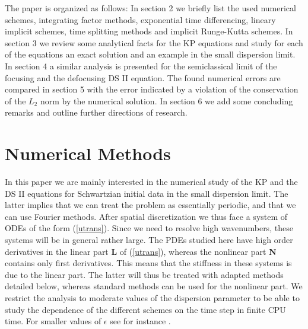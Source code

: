 \documentclass[final]{siamltex}
\begin{document}
The paper is organized as follows: In section 2 we briefly list the 
used numerical schemes, integrating factor methods, exponential time 
differencing, lineary implicit schemes, time splitting methods and 
implicit Runge-Kutta schemes. In 
section 3 we review some analytical facts for the KP equations and 
study  for each of the equations an exact solution and an example in the 
small  dispersion limit. In section 4 a similar 
analysis is presented for the semiclassical limit of the 
focusing and the defocusing DS II equation. The 
found numerical errors are compared in section 5 with the error 
indicated by a violation of the conservation of the $L_{2}$ norm by the numerical 
solution. In section 6 we add some concluding remarks 
and outline further directions of research. 
 
\section{Numerical Methods}
In this paper we are mainly interested in the numerical study of the KP and 
the DS II equations for Schwartzian initial data in the small 
dispersion limit. The latter implies that we can treat the problem as 
essentially periodic, and that we can use Fourier methods. After 
spatial discretization we thus face a system of ODEs of the form (\ref{utrans}). 
Since we need to resolve high wavenumbers, these systems will 
be in general rather large.  The PDEs studied here have high order 
derivatives in the linear part $\mathbf{L}$ of (\ref{utrans}), whereas the 
nonlinear part $\mathbf{N}$ contains only first derivatives. This means that 
the stiffness in these systems is due to the linear part. The latter 
will thus be treated with adapted methods detailed below, whereas 
standard methods can be used for the nonlinear part. We restrict the analysis 
to moderate values of the dispersion parameter	to be able to 
study the dependence of the different 
schemes on the time step in finite CPU time. For smaller values of $\epsilon$ see for 
instance \cite{KSM}.
\end{document}
